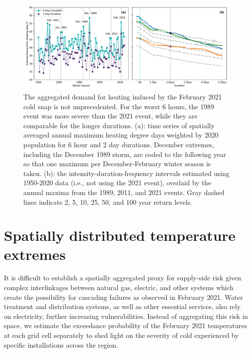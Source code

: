 \documentclass[12pt]{iopart}
\begin{document}
\begin{figure}
  \centering
  \includegraphics[width=\textwidth]{ERCOT_HDD_IDF_MLE_popweighted.pdf}
  \caption{
    The aggregated demand for heating induced by the February 2021 cold snap is not unprecedented.
    For the worst 6 hours, the 1989 event was more severe than the 2021 event, while they are comparable for the longer durations.
    (a): time series of spatially averaged annual maximum heating degree days weighted by 2020 population for 6 hour and 2 day durations.
    December extremes, including the December 1989 storm, are coded to the following year so that one maximum per December-February winter season is taken.
    (b): the intensity-duration-frequency intervals estimated using 1950-2020 data (i.e., not using the 2021 event), overlaid by the annual maxima from the 1989, 2011, and 2021 events.
    Gray dashed lines indicate 2, 5, 10, 25, 50, and 100 year return levels.
  }\label{fig:idf_weighted}
\end{figure}

\section{Spatially distributed temperature extremes}

It is difficult to establish a spatially aggregated proxy for supply-side risk given complex interlinkages between natural gas, electric, and other systems which create the possibility for cascading failures as observed in February 2021.
Water treatment and distribution systems, as well as other essential services, also rely on electricity, further increasing vulnerabilities.
Instead of aggregating this risk in space, we estimate the exceedance probability of the February 2021 temperatures at each grid cell separately to shed light on the severity of cold experienced by specific installations across the region.
\end{document}
